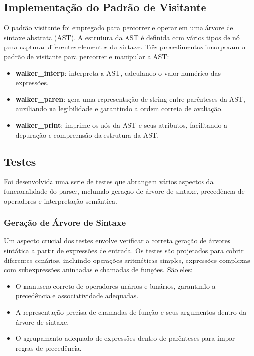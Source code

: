 \documentclass[english, 
               brazil, 
               bsc] %
               {dcomp-abntex2}
\begin{document}
\subsection{Implementação do Padrão de Visitante}

O padrão visitante foi empregado para percorrer e operar em uma árvore de sintaxe abstrata (AST). A estrutura da AST é definida com vários tipos de nó para capturar diferentes elementos da sintaxe.
Três procedimentos incorporam o padrão de visitante para percorrer e manipular a AST:

\begin{itemize}
  \item \textbf{walker\_interp}: interpreta a AST, calculando o valor numérico das expressões.
  \item \textbf{walker\_paren}: gera uma representação de string entre parênteses da AST, auxiliando na legibilidade e garantindo a ordem correta de avaliação.
  \item \textbf{walker\_print}: imprime os nós da AST e seus atributos, facilitando a depuração e compreensão da estrutura da AST.
\end{itemize}

\subsection{Testes}

Foi desenvolvida uma serie de testes que  abrangem vários aspectos da funcionalidade do parser, incluindo geração de árvore de sintaxe, precedência de operadores e interpretação semântica.

\subsubsection{Geração de Árvore de Sintaxe}

Um aspecto crucial dos testes envolve verificar a correta geração de árvores sintática a partir de expressões de entrada. Os testes são projetados para cobrir diferentes cenários, incluindo operações aritméticas simples, expressões complexas com subexpressões aninhadas e chamadas de funções. São eles:

\begin{itemize}
    \item O manuseio correto de operadores unários e binários, garantindo a precedência e associatividade adequadas.
    \item A representação precisa de chamadas de função e seus argumentos dentro da árvore de sintaxe.
    \item O agrupamento adequado de expressões dentro de parênteses para impor regras de precedência.
\end{itemize}
\end{document}

